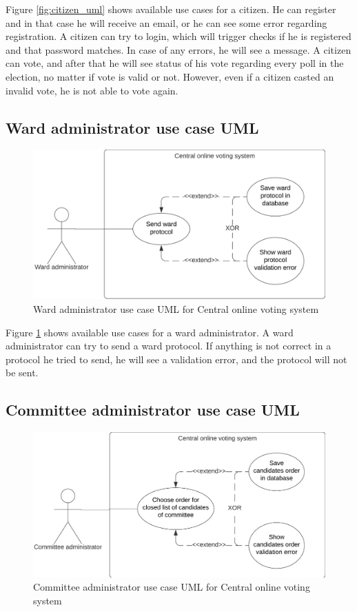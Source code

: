 \documentclass[a4paper,twoside,12pt]{book}
\newcommand{\Title}{Central online voting system}
\begin{document}
    Figure \ref{fig:citizen_uml} shows available use cases for a citizen. He can register and in that case he will receive an email, 
    or he can see some error regarding registration. A citizen can try to login, which will trigger checks if he is registered and that password matches.
    In case of any errors, he will see a message. 
    A citizen can vote, and after that he will see status of his vote regarding every poll in the election, no matter if vote is valid or not.
    However, even if a citizen casted an invalid vote, he is not able to vote again.
    \pagebreak

    \subsection{Ward administrator use case UML}
    \begin{figure}[h]
      \centering
      \includegraphics[width=0.65\linewidth]{ward_admin_uml.png}
      \caption{Ward administrator use case UML for \Title}
      \label{fig:ward_admin_uml}
    \end{figure}

    Figure \ref{fig:ward_admin_uml} shows available use cases for a ward administrator. A ward administrator can try to send a ward protocol.
    If anything is not correct in a protocol he tried to send, he will see a validation error, and the protocol will not be sent.

    \subsection{Committee administrator use case UML}
    \begin{figure}[h]
      \centering
      \includegraphics[width=0.65\linewidth]{committee_admin_uml.png}
      \caption{Committee administrator use case UML for \Title}
      \label{fig:committee_admin_uml}
    \end{figure}
\end{document}
